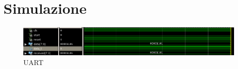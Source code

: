 %

\section{Simulazione}

\begin{figure}[H]
	\centering
\includegraphics[scale=0.5]{esercizio15/images/UART_testbench.png}
	\caption{UART}
\end{figure}%

